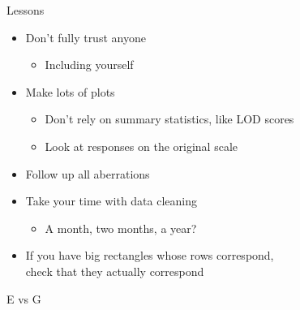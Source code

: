 \documentclass[12pt,t]{beamer}
\begin{document}
\begin{frame}[c]{Lessons}

\small

\begin{itemize}
\itemsep8pt

\item Don't fully trust anyone
\begin{itemize}
\item Including yourself
\end{itemize}

\item Make lots of plots
\begin{itemize}
\item Don't rely on summary statistics, like LOD scores
\item Look at responses on the original scale
\end{itemize}

\item Follow up all aberrations

\item Take your time with data cleaning
\begin{itemize}
\item A month, two months, a year?
\end{itemize}

\item If you have big rectangles whose rows correspond, \\
  check that they {\hilit actually} correspond

\end{itemize}
\note{}
\end{frame}


\begin{frame}[c]{E vs G}


\note{}
\end{frame}
\end{document}

